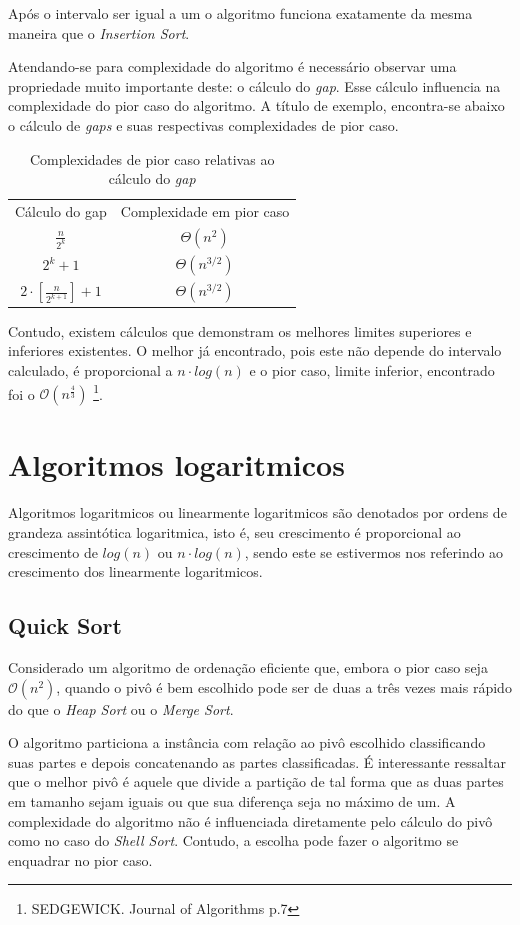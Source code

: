 \documentclass[a4paper, 12pt]{report}
\begin{document}
Após o intervalo ser igual a um o algoritmo funciona exatamente da mesma
maneira que o \emph{Insertion Sort}.

Atendando-se para complexidade do algoritmo é necessário observar uma
propriedade muito importante deste: o cálculo do \emph{gap}. Esse cálculo influencia
na complexidade do pior caso do algoritmo. A título de exemplo, encontra-se
abaixo o cálculo de \emph{gaps} e suas respectivas complexidades de pior caso.

\begin{table}[htb]
\caption{Complexidades de pior caso relativas ao cálculo do \emph{gap}}
\centering
\begin{tabular}{cc}
Cálculo do gap & Complexidade em pior caso\\
$\frac{n}{2^k}$ & $\Theta(n^2)$\\
$2^k + 1$ & $\Theta(n^{3/2})$\\
$2 \cdot [\frac{n}{2^{k+1}}]+1$ & $\Theta(n^{3/2})$\\
\end{tabular}
\end{table}

Contudo, existem cálculos que demonstram os melhores limites superiores e
inferiores existentes. O melhor já encontrado, pois este não depende do
intervalo calculado, é proporcional a $n \cdot log(n)$ e o pior caso,
limite inferior, encontrado foi o $\mathcal{O}(n^{\frac{4}{3}})$ \footnote{SEDGEWICK. Journal of Algorithms p.7}.

\chapter{Algoritmos logaritmicos}
\label{sec-2-2}
Algoritmos logaritmicos ou linearmente logaritmicos são denotados por ordens
de grandeza assintótica logaritmica, isto é, seu crescimento é proporcional
ao crescimento de $log{}(n)$ ou $n \cdot log{}(n)$, sendo este se estivermos
nos referindo ao crescimento dos linearmente logaritmicos.

\section{Quick Sort}
\label{sec-2-2-1}
Considerado um algoritmo de ordenação eficiente que, embora o pior caso seja
$\mathcal{O}(n^2)$, quando o pivô é bem escolhido pode ser de duas a três
vezes mais rápido do que o \emph{Heap Sort} ou o \emph{Merge Sort}.

O algoritmo particiona a instância com relação ao pivô escolhido classificando
suas partes e depois concatenando as partes classificadas. É interessante
ressaltar que o melhor pivô é aquele que divide a partição de tal forma que
as duas partes em tamanho sejam iguais ou que sua diferença seja no máximo
de um. A complexidade do algoritmo não é influenciada diretamente pelo
cálculo do pivô como no caso do \emph{Shell Sort}. Contudo, a escolha pode fazer
o algoritmo se enquadrar no pior caso.
\end{document}
